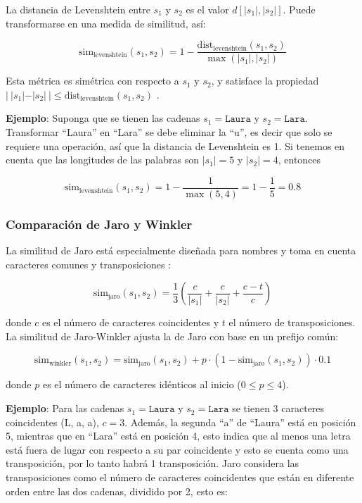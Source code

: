 \documentclass[
  12pt,
]{book}
\begin{document}
La distancia de Levenshtein entre \(s_1\) y \(s_2\) es el valor \(d[|s_1|, |s_2|]\). Puede transformarse en una medida de similitud, así:

\[\text{sim}_{\text{levenshtein}}(s_1, s_2) = 1 - \frac{\text{dist}_{\text{levenshtein}}(s_1, s_2)}{\max(|s_1|, |s_2|)}\]

Esta métrica es simétrica con respecto a \(s_1\) y \(s_2\), y satisface la propiedad \(|\ |s_1| - |s_2|\ | \le \text{dist}_{\text{levenshtein}}(s_1, s_2)\) \citep{christen2012data}.

\textbf{Ejemplo}: Suponga que se tienen las cadenas \(s_1 = \texttt{Laura}\) y \(s_2=\texttt{Lara}\). Transformar ``Laura'' en ``Lara'' se debe eliminar la ``u'', es decir que solo se requiere una operación, así que la distancia de Levenshtein es 1. Si tenemos en cuenta que las longitudes de las palabras son \(|s_1|=5\) y \(|s_2|=4\), entonces

\[\text{sim}_{\text{levenshtein}}(s_1, s_2) = 1 - \frac{1}{\max(5, 4)}=1-\frac{1}{5}=0.8\]

\subsubsection{Comparación de Jaro y Winkler}\label{comparaciuxf3n-de-jaro-y-winkler}

La similitud de Jaro está especialmente diseñada para nombres y toma en cuenta caracteres comunes y transposiciones \citep{christen2012data}:

\[\text{sim}_{\text{jaro}}(s_1, s_2) = \frac{1}{3} \left( \frac{c}{|s_1|} + \frac{c}{|s_2|} + \frac{c - t}{c} \right)\]

donde \(c\) es el número de caracteres coincidentes y \(t\) el número de transposiciones. La similitud de Jaro-Winkler ajusta la de Jaro con base en un prefijo común:

\[\text{sim}_{\text{winkler}}(s_1, s_2) = \text{sim}_{\text{jaro}}(s_1, s_2) + p \cdot (1 - \text{sim}_{\text{jaro}}(s_1, s_2)) \cdot 0.1\]

donde \(p\) es el número de caracteres idénticos al inicio (\(0\leq p \leq 4\)).

\textbf{Ejemplo}: Para las cadenas \(s_1 = \texttt{Laura}\) y \(s_2=\texttt{Lara}\) se tienen 3 caracteres coincidentes (L, a, a), \(c=3\). Además, la segunda ``a'' de ``Laura'' está en posición 5, mientras que en ``Lara'' está en posición 4, esto indica que al menos una letra está fuera de lugar con respecto a su par coincidente y esto se cuenta como una transposición, por lo tanto habrá 1 transposición. Jaro considera las transposiciones como el número de caracteres coincidentes que están en diferente orden entre las dos cadenas, dividido por 2, esto es:
\end{document}
